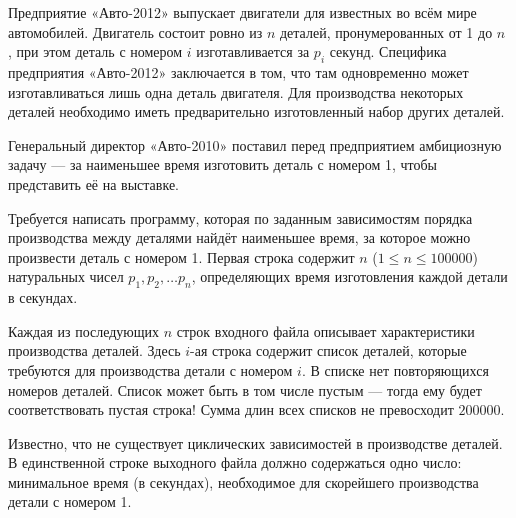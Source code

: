 Предприятие «Авто-2012» выпускает двигатели для известных во всём мире автомобилей. Двигатель состоит ровно из $n$ деталей, пронумерованных от 1 до $n$ , при этом деталь с номером $i$ изготавливается за $p_i$ секунд. Специфика предприятия «Авто-2012» заключается в том, что там одновременно может изготавливаться лишь одна деталь двигателя. Для производства некоторых деталей необходимо иметь предварительно изготовленный набор других деталей.

Генеральный директор «Авто-2010» поставил перед предприятием амбициозную задачу --- за наименьшее время изготовить деталь с номером 1, чтобы представить её на выставке.

Требуется написать программу, которая по заданным зависимостям порядка производства между деталями найдёт наименьшее время, за которое можно произвести деталь с номером 1.
\InputFile
Первая строка содержит $n$ ($1 \leq n \leq 100000$) натуральных чисел $p_1, p_2, \dots p_n$, определяющих время изготовления каждой детали в секундах.

Каждая из последующих $n$ строк входного файла описывает характеристики производства деталей. Здесь $i$-ая строка содержит список деталей, которые требуются для производства детали с номером $i$. В списке нет повторяющихся номеров деталей. Список может быть в том числе пустым --- тогда ему будет соответствовать пустая строка! Сумма длин всех списков не превосходит $200000$.

Известно, что не существует циклических зависимостей в производстве деталей.
\OutputFile
В единственной строке выходного файла должно содержаться одно число: минимальное время (в секундах), необходимое для скорейшего производства детали с номером 1.

